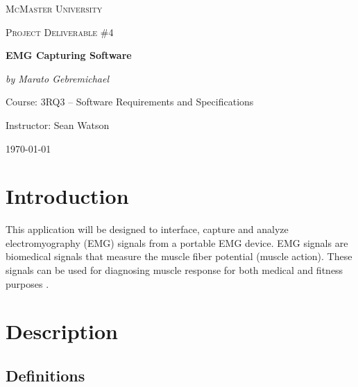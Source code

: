 \documentclass[12pt,a4paper]{article}
\begin{document}
\begin{titlepage}
	\centering
	{\scshape\LARGE McMaster University \par}
	\vspace{2cm}
	{\scshape\Large Project Deliverable \#4 \par}
	\vspace{4cm}
	{\huge\bfseries EMG Capturing Software\par}
	\vspace{2cm}
	{\Large\itshape by Marato Gebremichael\par}
	
	\vfill
	Course: 3RQ3 – Software Requirements and Specifications\par
    Instructor: Sean Watson

	\vfill

	{\large \today\par}
\end{titlepage}

\tableofcontents

\newpage

\listoftables

\listoffigures

\newpage

\section{Introduction}

\indent This application will be designed to interface, capture and analyze electromyography (EMG) signals from a portable EMG device. 
EMG signals are biomedical signals that measure the muscle fiber potential (muscle action). 
These signals can be used for diagnosing muscle response for both medical and fitness purposes \cite{Mayo Clinic}.

\section{Description}

\subsection{Definitions}
\end{document}
